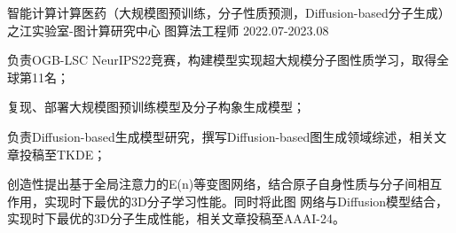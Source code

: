 \begin{cventries}
  \cventry
  {智能计算计算医药（大规模图预训练，分子性质预测，Diffusion-based分子生成）} %
  {之江实验室-图计算研究中心} %
  {图算法工程师} %
  {2022.07-2023.08} %
  {
    \begin{cvitems} %
      \item {负责OGB-LSC NeurIPS22竞赛，构建模型实现超大规模分子图性质学习，取得全球第11名；}
      \item {复现、部署大规模图预训练模型及分子构象生成模型；}
      \item {负责Diffusion-based生成模型研究，撰写Diffusion-based图生成领域综述，相关文章投稿至TKDE；}
      \item {创造性提出基于全局注意力的E(n)等变图网络，结合原子自身性质与分子间相互作用，实现时下最优的3D分子学习性能。同时将此图
      网络与Diffusion模型结合，实现时下最优的3D分子生成性能，相关文章投稿至AAAI-24。}
    \end{cvitems}
  }
\end{cventries}
